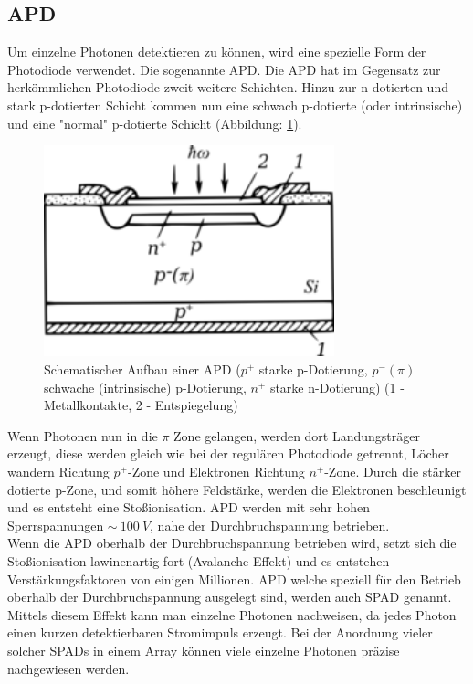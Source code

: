 \subsection{\acf{APD}}\label{subsec:apd}
Um einzelne Photonen detektieren zu können, wird eine spezielle Form der Photodiode verwendet. Die sogenannte \ac{APD}. Die \ac{APD} hat im Gegensatz zur herkömmlichen Photodiode zweit weitere Schichten. Hinzu zur n-dotierten und stark p-dotierten Schicht kommen nun eine schwach p-dotierte (oder intrinsische) und eine "normal" p-dotierte Schicht (Abbildung: \ref{apd}). 
\begin{figure}[H]
	\centering
	\includegraphics[width=0.75\textwidth]{images/GrundlagenLaserentfernungsmessung/APD}
	\caption{Schematischer Aufbau einer \ac{APD} \cite{APD_Scematic} ($p^+$ starke p-Dotierung, $p^- (\pi)$ schwache (intrinsische) p-Dotierung, $n^+$ starke n-Dotierung) (1 - Metallkontakte, 2 - Entspiegelung)}
	\label{apd}
\end{figure}
Wenn Photonen nun in die $\pi$ Zone gelangen, werden dort Landungsträger erzeugt, diese werden gleich wie bei der regulären Photodiode getrennt, Löcher wandern Richtung $p^+$-Zone und Elektronen Richtung $n^+$-Zone. Durch die stärker dotierte p-Zone, und somit höhere Feldstärke, werden die Elektronen beschleunigt und es entsteht eine Stoßionisation. \ac{APD} werden mit sehr hohen Sperrspannungen $\sim \:100\:V$, nahe der Durchbruchspannung betrieben. \cite{SPAD_mamamatsu} \\
Wenn die \ac{APD} oberhalb der Durchbruchspannung betrieben wird, setzt sich die Stoßionisation lawinenartig fort (Avalanche-Effekt) und es entstehen Verstärkungsfaktoren von einigen Millionen. \ac{APD} welche speziell für den Betrieb oberhalb der Durchbruchspannung ausgelegt sind, werden auch \ac{SPAD} genannt. Mittels diesem Effekt kann man einzelne Photonen nachweisen, da jedes Photon einen kurzen detektierbaren Stromimpuls erzeugt. Bei der Anordnung vieler solcher \acp{SPAD} in einem Array können viele einzelne Photonen präzise nachgewiesen werden. \cite{SPAD_elmer}\\
